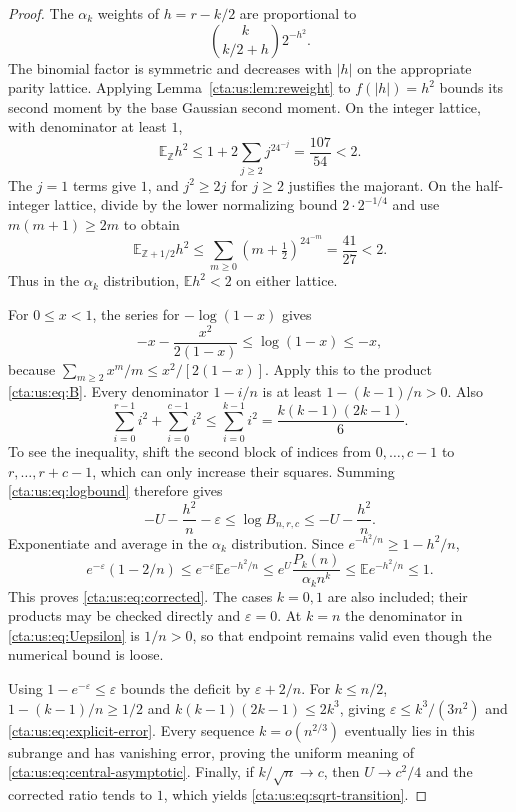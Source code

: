 \documentclass[11pt]{article}
\theoremstyle{definition}
\theoremstyle{remark}
\newcommand{\E}{\mathbb E}
\newcommand{\Z}{\mathbb Z}
\newcommand{\eps}{\varepsilon}
\begin{document}
\begin{proof}
The $\alpha_k$ weights of $h=r-k/2$ are proportional to
\[
 \binom k{k/2+h}2^{-h^2}.
\]
The binomial factor is symmetric and decreases with $|h|$ on the
appropriate parity lattice. Applying Lemma~\ref{cta:us:lem:reweight} to
$f(|h|)=h^2$ bounds its second moment by the base Gaussian second
moment. On the integer lattice, with denominator at least $1$,
\begin{equation}\label{cta:us:eq:integer-moment}
 \E_{\Z}h^2\le1+2\sum_{j\ge2}j^24^{-j}
 =\frac{107}{54}<2.
\end{equation}
The $j=1$ terms give $1$, and $j^2\ge2j$ for $j\ge2$ justifies
the majorant. On the half-integer lattice, divide by the lower
normalizing bound $2\cdot2^{-1/4}$ and use $m(m+1)\ge2m$ to obtain
\begin{equation}\label{cta:us:eq:half-moment}
 \E_{\Z+1/2}h^2\le\sum_{m\ge0}(m+\tfrac12)^24^{-m}
 =\frac{41}{27}<2.
\end{equation}
Thus in the $\alpha_k$ distribution, $\E h^2<2$ on either lattice.

For $0\le x<1$, the series for $-\log(1-x)$ gives
\begin{equation}\label{cta:us:eq:logbound}
 -x-\frac{x^2}{2(1-x)}\le\log(1-x)\le-x,
\end{equation}
because $\sum_{m\ge2}x^m/m\le x^2/[2(1-x)]$. Apply this to
the product \eqref{cta:us:eq:B}. Every denominator $1-i/n$ is at least
$1-(k-1)/n>0$. Also
\[
 \sum_{i=0}^{r-1}i^2+\sum_{i=0}^{c-1}i^2
 \le\sum_{i=0}^{k-1}i^2=\frac{k(k-1)(2k-1)}6.
\]
To see the inequality, shift the second block of indices from
$0,\ldots,c-1$ to $r,\ldots,r+c-1$, which can only increase
their squares. Summing \eqref{cta:us:eq:logbound} therefore gives
\begin{equation}\label{cta:us:eq:logB}
 -U-\frac{h^2}{n}-\eps\le\log B_{n,r,c}
 \le-U-\frac{h^2}{n}.
\end{equation}
Exponentiate and average in the $\alpha_k$ distribution. Since
$e^{-h^2/n}\ge1-h^2/n$,
\[
 e^{-\eps}(1-2/n)
 \le e^{-\eps}\E e^{-h^2/n}
 \le e^U\frac{P_k(n)}{\alpha_kn^k}
 \le\E e^{-h^2/n}\le1.
\]
This proves \eqref{cta:us:eq:corrected}. The cases $k=0,1$ are also
included; their products may be checked directly and $\eps=0$.
At $k=n$ the denominator in \eqref{cta:us:eq:Uepsilon} is $1/n>0$,
so that endpoint remains valid even though the numerical bound is loose.

Using $1-e^{-\eps}\le\eps$ bounds the deficit by $\eps+2/n$.
For $k\le n/2$, $1-(k-1)/n\ge1/2$ and
$k(k-1)(2k-1)\le2k^3$, giving
$\eps\le k^3/(3n^2)$ and \eqref{cta:us:eq:explicit-error}.
Every sequence $k=o(n^{2/3})$ eventually lies in this subrange and
has vanishing error, proving the uniform meaning of
\eqref{cta:us:eq:central-asymptotic}. Finally, if $k/\sqrt n\to c$, then
$U\to c^2/4$ and the corrected ratio tends to $1$, which yields
\eqref{cta:us:eq:sqrt-transition}.
\end{proof}
\end{document}
